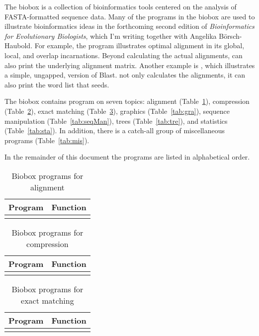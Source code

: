 The biobox is a collection of bioinformatics tools centered on the
analysis of FASTA-formatted sequence data. Many of the programs in the
biobox are used to illustrate bioinformatics ideas in the forthcoming
second edition of \emph{Bioinformatics for Evolutionary Biologists},
which I'm writing together with Angelika Börsch-Haubold. For example,
the program  illustrates optimal alignment in its global,
local, and overlap incarnations. Beyond calculating the actual
alignments,  can also print the underlying alignment
matrix. Another example is , which illustrates a simple,
ungapped, version of Blast.  not only calculates
the alignments, it can also print the word list that seeds.

The biobox contains program on seven topics: alignment
(Table~\ref{tab:ali}), compression (Table~\ref{tab:com}), exact
matching (Table~\ref{tab:exa}), graphics (Table~\ref{tab:gra}),
sequence manipulation (Table~\ref{tab:seqMan}), trees
(Table~\ref{tab:tre}), and statistics (Table~\ref{tab:sta}). In
addition, there is a catch-all group of miscellaneous programs
(Table~\ref{tab:mis}).

In the remainder of this document the programs are listed in
alphabetical order.

\begin{table}
  \caption{Biobox programs for alignment}\label{tab:ali}
  \begin{center}
    \begin{tabular}{ll}
      \hline
      Program & Function\\\hline
      \\
      \hline
    \end{tabular}
  \end{center}
\end{table}

\begin{table}
  \caption{Biobox programs for compression}\label{tab:com}
  \begin{center}
    \begin{tabular}{ll}
    \hline
    Program & Function\\\hline
      \\
      \hline
    \end{tabular}
  \end{center}
\end{table}

\begin{table}
  \caption{Biobox programs for exact matching}\label{tab:exa}
  \begin{center}
    \begin{tabular}{ll}
      \hline
      Program & Function\\\hline
      \\
      \hline
    \end{tabular}
  \end{center}
\end{table}

